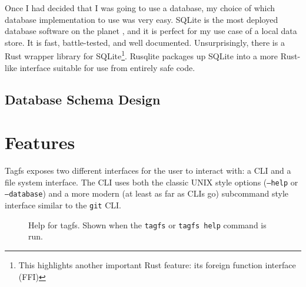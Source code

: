 Once I had decided that I was going to use a database, my choice of which
database implementation to use was very easy. SQLite is the most deployed
database software on the planet \cite{sqlite-most-used}, and it is perfect for
my use case of a local data store. It is fast, battle-tested, and well
documented. Unsurprisingly, there is a Rust wrapper library for
SQLite\footnote{This highlights another important Rust feature: its foreign
function interface (FFI)}. Rusqlite packages up SQLite into a more Rust-like
interface suitable for use from entirely safe code. 


\subsection{Database Schema Design}

\section{Features}
\label{section:features}

Tagfs exposes two different interfaces for the user to interact with: a CLI and
a file system interface. The CLI uses both the classic UNIX style options
(\texttt{--help} or \texttt{--database}) and a more modern (at least as far as
CLIs go) subcommand style interface similar to the \texttt{git} CLI.

\begin{figure}[h]
    \centering
    \caption{Help for tagfs. Shown when the \texttt{tagfs} or \texttt{tagfs
    help} command is run. }
    \label{fig:root-cli}
\end{figure}

